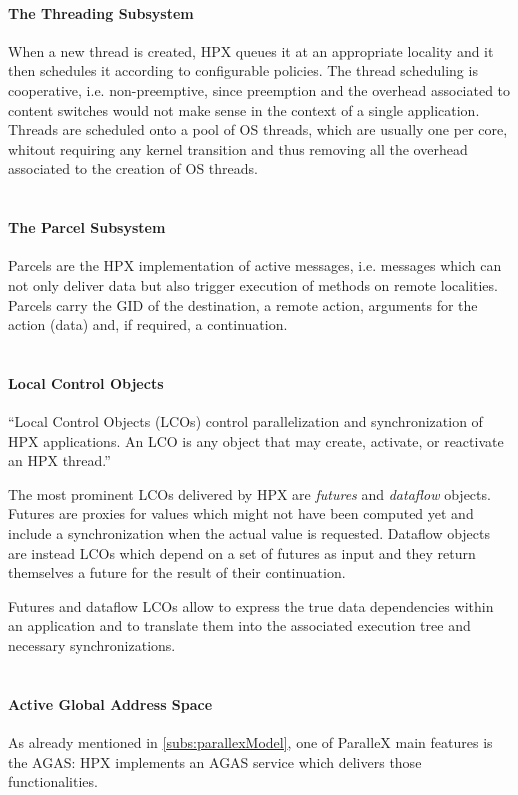 \paragraph{The Threading Subsystem}
When a new thread is created, HPX queues it at an appropriate locality and it then schedules it according to configurable policies. The thread scheduling is cooperative, i.e. non-preemptive, since preemption and the overhead associated to content switches would not make sense in the context of a single application. Threads are scheduled onto a pool of OS threads, which are usually one per core, whitout requiring any kernel transition and thus removing all the overhead associated to the creation of OS threads.
~\\~

\paragraph{The Parcel Subsystem}
Parcels are the HPX implementation of active messages, i.e. messages which can not only deliver data but also trigger execution of methods on remote localities.
Parcels carry the GID of the destination, a remote action, arguments for the action (data) and, if required, a continuation.
~\\~

\paragraph{Local Control Objects}
``Local Control Objects (LCOs) control parallelization and synchronization of
HPX applications. An LCO is any object that may create, activate, or reactivate
an HPX thread.''\cite{grubel2016dynamic}

The most prominent LCOs delivered by HPX are \emph{futures} and \emph{dataflow} objects. Futures are proxies for values which might not have been computed yet and include a synchronization when the actual value is requested. Dataflow objects are instead LCOs which depend on a set of futures as input and they return themselves a future for the result of their continuation.

Futures and dataflow LCOs allow to express the true data dependencies within an application and to translate them into the associated execution tree and necessary synchronizations.
~\\~

\paragraph{Active Global Address Space}
As already mentioned in \ref{subs:parallexModel}, one of ParalleX main features is the AGAS: HPX implements an AGAS service which delivers those functionalities.
~\\~

